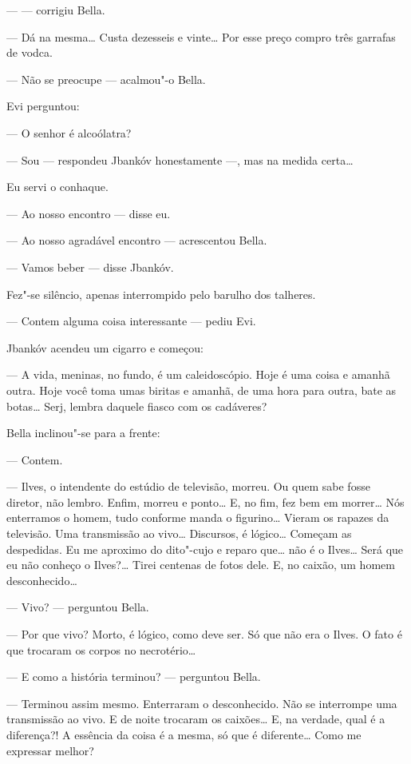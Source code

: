 ---  --- corrigiu Bella.

--- Dá na mesma\ldots{} Custa dezesseis e vinte\ldots{} Por esse preço
compro três garrafas de vodca.

--- Não se preocupe --- acalmou"-o Bella.

Evi perguntou:

--- O senhor é alcoólatra?

--- Sou --- respondeu Jbankóv honestamente ---, mas
na medida certa\ldots{}

Eu servi o conhaque.

--- Ao nosso encontro --- disse eu.

--- Ao nosso agradável encontro --- acrescentou Bella.

--- Vamos beber --- disse Jbankóv.

Fez"-se silêncio, apenas interrompido pelo barulho dos talheres.

--- Contem alguma coisa interessante --- pediu Evi.

Jbankóv acendeu um cigarro e começou:

--- A vida, meninas, no fundo, é um caleidoscópio. Hoje é uma
coisa e amanhã outra. Hoje você toma umas biritas e amanhã, de uma hora
para outra, bate as botas\ldots{} Serj, lembra daquele fiasco com os
cadáveres?

Bella inclinou"-se para a frente:

--- Contem.

--- Ilves, o intendente do estúdio de televisão, morreu. Ou quem
sabe fosse diretor, não lembro. Enfim, morreu e ponto\ldots{} E, no fim, fez
bem em morrer\ldots{} Nós enterramos o homem, tudo conforme manda o
figurino\ldots{} Vieram os rapazes da televisão. Uma transmissão ao vivo\ldots{}
Discursos, é lógico\ldots{} Começam as despedidas. Eu me aproximo do
dito"-cujo e reparo que\ldots{} não é o Ilves\ldots{} Será que eu não conheço o
Ilves?\ldots{} Tirei centenas de fotos dele. E, no caixão, um homem
desconhecido\ldots{}

--- Vivo? --- perguntou Bella.

--- Por que vivo? Morto, é lógico, como deve ser. Só que não
era o Ilves. O fato é que trocaram os corpos no necrotério\ldots{}

--- E como a história terminou? --- perguntou Bella.

--- Terminou assim mesmo. Enterraram o desconhecido. Não se
interrompe uma transmissão ao vivo. E de noite trocaram os caixões\ldots{} E,
na verdade, qual é a diferença?! A essência da coisa é a mesma, só que é
diferente\ldots{} Como me expressar melhor?

